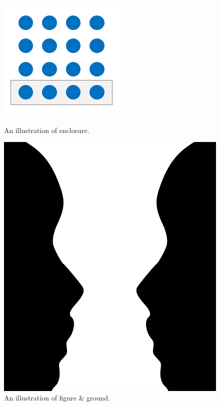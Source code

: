 \begin{figure}[!htb]
  				\endminipage\hfill
  					\includegraphics[width=\linewidth]{resources/images/enclosure.png}
  					\caption{An illustration of enclosure.}\label{fig:enclosure}
  				\endminipage\hfill
  					\includegraphics[width=0.75\linewidth]{resources/images/figure_ground.png}
  					\caption{An illustration of figure \& ground.}\label{fig:figure_ground}
  				\endminipage\hfill
			\end{figure}
			
